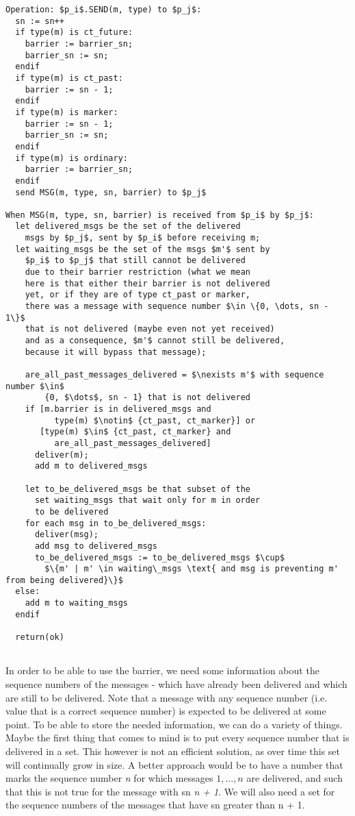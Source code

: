 \documentclass[12pt]{article}
\theoremstyle{plain}
\begin{document}
\clearpage

\begin{lstlisting}[frame=single]
Operation: $p_i$.SEND(m, type) to $p_j$:
  sn := sn++
  if type(m) is ct_future:
    barrier := barrier_sn;
    barrier_sn := sn;
  endif
  if type(m) is ct_past:
    barrier := sn - 1;
  endif
  if type(m) is marker:
    barrier := sn - 1;
    barrier_sn := sn;
  endif
  if type(m) is ordinary:
    barrier := barrier_sn;
  endif
  send MSG(m, type, sn, barrier) to $p_j$

When MSG(m, type, sn, barrier) is received from $p_i$ by $p_j$:
  let delivered_msgs be the set of the delivered 
    msgs by $p_j$, sent by $p_i$ before receiving m;
  let waiting_msgs be the set of the msgs $m'$ sent by
    $p_i$ to $p_j$ that still cannot be delivered
    due to their barrier restriction (what we mean
    here is that either their barrier is not delivered
    yet, or if they are of type ct_past or marker,
    there was a message with sequence number $\in \{0, \dots, sn - 1\}$
    that is not delivered (maybe even not yet received)
    and as a consequence, $m'$ cannot still be delivered,
    because it will bypass that message);
    
    are_all_past_messages_delivered = $\nexists m'$ with sequence number $\in$ 
        {0, $\dots$, sn - 1} that is not delivered
    if [m.barrier is in delivered_msgs and
          type(m) $\notin$ {ct_past, ct_marker}] or
       [type(m) $\in$ {ct_past, ct_marker} and
          are_all_past_messages_delivered]
      deliver(m);
      add m to delivered_msgs

    let to_be_delivered_msgs be that subset of the
      set waiting_msgs that wait only for m in order
      to be delivered 
    for each msg in to_be_delivered_msgs:
      deliver(msg);
      add msg to delivered_msgs
      to_be_delivered_msgs := to_be_delivered_msgs $\cup$
        $\{m' | m' \in waiting\_msgs \text{ and msg is preventing m' from being delivered}\}$
  else:
    add m to waiting_msgs
  endif

  return(ok)
 
\end{lstlisting}


In order to be able to use the barrier, we need some information about the 
sequence numbers of the messages - which have already been delivered and which
are still to be delivered. Note that a message with any sequence number (i.e.
value that is a correct sequence number) is expected to be delivered at some
point. To be able to store the needed information, we can do a variety of things.
Maybe the first thing that comes to mind is to put every sequence number that is
delivered in a set. This however is not an efficient solution, as over time
this set will continually grow in size. A better approach would be to have a
number that marks the sequence number \emph{n} for which messages $1, \dots, n$
are delivered, and such that this is not true for the message with sn
\emph{n + 1}. We will also need a set for the sequence numbers of the messages
that have sn greater than n + 1.  
\end{document}
